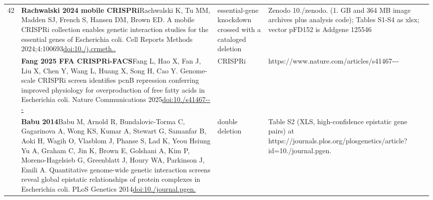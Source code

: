 \begin{landscape}
\begin{longtable}{@{}r@{\hspace{4pt}} L{86mm} L{74mm} L{78mm}@{}}
42 & \textbf{Rachwalski 2024 mobile CRISPRi}\newline Rachwalski K, Tu MM, Madden SJ, French S, Hansen DM, Brown ED. A mobile CRISPRi collection enables genetic interaction studies for the essential genes of Escherichia coli. Cell Reports Methods 2024;4:100693\newline \href{https://doi.org/10.1016/j.crmeth.2023.100693}{doi:10./\allowbreak j.\allowbreak crmeth..} & essential-gene knockdown crossed with a cataloged deletion & Zenodo 10./\allowbreak zenodo. (1. GB and 364 MB image archives plus analysis code); Tables S1-\allowbreak S4 as xlsx; vector pFD152 is Addgene 125546 \\
 & \textbf{Fang 2025 FFA CRISPRi-FACS}\newline Fang L, Hao X, Fan J, Liu X, Chen Y, Wang L, Huang X, Song H, Cao Y. Genome-scale CRISPRi screen identifies pcnB repression conferring improved physiology for overproduction of free fatty acids in Escherichia coli. Nature Communications 2025\newline \href{https://doi.org/10.1038/s41467-025-58368-3}{doi:10./\allowbreak s41467---} & CRISPRi & https:/\allowbreak /\allowbreak www.\allowbreak nature.\allowbreak com/\allowbreak articles/\allowbreak s41467--- \\
 & \textbf{Babu 2014}\newline Babu M, Arnold R, Bundalovic-Torma C, Gagarinova A, Wong KS, Kumar A, Stewart G, Samanfar B, Aoki H, Wagih O, Vlasblom J, Phanse S, Lad K, Yeou Hsiung Yu A, Graham C, Jin K, Brown E, Golshani A, Kim P, Moreno-Hagelsieb G, Greenblatt J, Houry WA, Parkinson J, Emili A. Quantitative genome-wide genetic interaction screens reveal global epistatic relationships of protein complexes in Escherichia coli. PLoS Genetics 2014\newline \href{https://doi.org/10.1371/journal.pgen.1004120}{doi:10./\allowbreak journal.\allowbreak pgen.} & double deletion & Table S2 (XLS, high-\allowbreak confidence epistatic gene pairs) at https:/\allowbreak /\allowbreak journals.\allowbreak plos.\allowbreak org/\allowbreak plosgenetics/\allowbreak article?id=10./\allowbreak journal.\allowbreak pgen. \\

\end{longtable}
\end{landscape}
